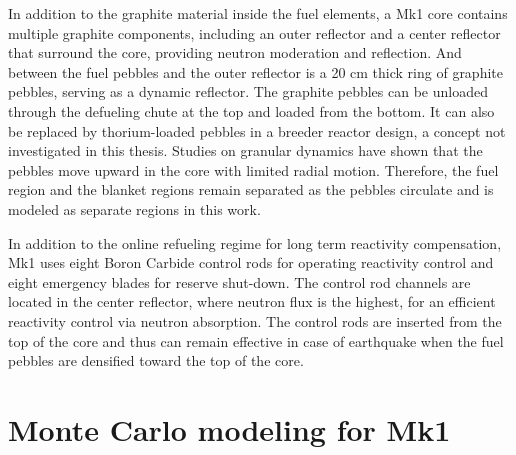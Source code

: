 \documentclass{elsarticle}
\begin{document}



In addition to the graphite material inside the fuel elements, a Mk1 core contains multiple graphite components, including an outer reflector and a center reflector that surround the core, providing neutron moderation and reflection. 
And between the fuel pebbles and the outer reflector is a 20 cm thick ring of graphite pebbles, serving as a dynamic reflector. The graphite pebbles can be unloaded through the defueling chute at the top and loaded from the bottom. It can also be replaced by thorium-loaded pebbles in a breeder reactor design, a concept not investigated in this thesis. 
Studies on granular dynamics \cite{Laufer2013} have shown that the pebbles move upward in the core with limited radial motion. Therefore, the fuel region and the blanket regions remain separated as the pebbles circulate and is modeled as separate regions in this work.

In addition to the online refueling regime for long term reactivity compensation, Mk1 uses eight Boron Carbide control rods for operating reactivity control and eight emergency blades for reserve shut-down. The control rod channels are located in the center reflector, where neutron flux is the highest, for an efficient reactivity control via neutron absorption. 
The control rods are inserted from the top of the core and thus can remain effective in case of earthquake when the fuel pebbles are densified toward the top of the core.








\section{Monte Carlo modeling for Mk1}
\label{sec:Mk1_serp}
\end{document}

